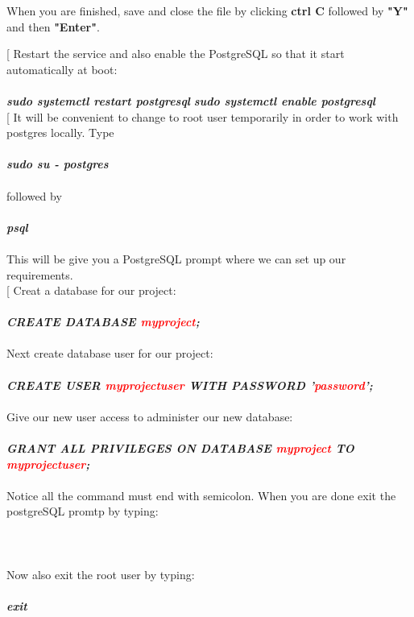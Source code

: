 \documentclass[a4paper]{article}
\makeatletter
\def\step{%
	\@ifnextchar[ \@myitem{\@noitemargtrue\@myitem[\@itemlabel]}}
\def\@myitem[#1]{\item[#1]\mbox{}\\}
\newenvironment{Step}{%
	\begin{enumerate}[label= \textbf {Step} \arabic*,align=left, leftmargin=1.0cm]%
	}{
\end{enumerate}%
}
\makeatother
\begin{document}
\begin{Step}
\begin{minipage}[t]{\linewidth}
	\medskip
	When you are finished, save and close the file by clicking \textbf{ctrl C} followed by \textbf{"Y"} and then \textbf{"Enter"}. \\
\end{minipage}

\step
Restart the service and also enable the PostgreSQL so that it start automatically at boot:\\ \\
\textbf{\emph{sudo systemctl restart postgresql}}
\textbf{\emph{sudo systemctl enable postgresql}}\\
\step
It will be convenient to change to root user temporarily in order to work with postgres locally. Type\\ \\
\textbf{\emph{sudo su - postgres}}\\ \\followed by\\ \\
\textbf{\emph{psql}}\\ \\
This will be give you a PostgreSQL prompt where we can set up our requirements.\\

\step
Creat a database for our project:\\ \\
\textbf{\emph{CREATE DATABASE \textcolor{red}{myproject};}}\\ \\
Next create database user for our project:\\ \\
\textbf{\emph{CREATE USER \textcolor{red}{myprojectuser} WITH PASSWORD '\textcolor{red}{password}';}}\\ \\
Give our new user access to administer our new database:\\ \\
\textbf{\emph{GRANT ALL PRIVILEGES ON DATABASE \textcolor{red}{myproject} TO \textcolor{red}{myprojectuser};}}\\ \\
Notice all the command must end with semicolon. When you are done exit the postgreSQL promtp by typing:\\ \\
\\ \\
Now also exit the root user by typing:\\ \\
\textbf{\emph{exit}}\\


\end{Step}
\end{document}
